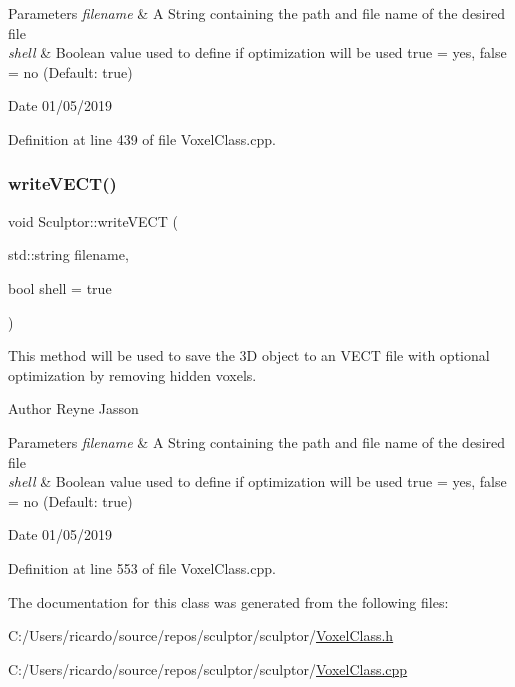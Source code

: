 \begin{DoxyParams}{Parameters}
{\em filename} & A String containing the path and file name of the desired file \\
\hline
{\em shell} & Boolean value used to define if optimization will be used true = yes, false = no (Default\+: true)\\
\hline
\end{DoxyParams}
\begin{DoxyDate}{Date}
01/05/2019 
\end{DoxyDate}


Definition at line 439 of file Voxel\+Class.\+cpp.

\mbox{\label{class_sculptor_a5a83472a0430fa9492e7a9ff5926dedb}} 
\subsubsection{\texorpdfstring{writeVECT()}{writeVECT()}}
{\footnotesize\ttfamily void Sculptor\+::write\+V\+E\+CT (\begin{DoxyParamCaption}\item[{std\+::string}]{filename,  }\item[{bool}]{shell = {\ttfamily true} }\end{DoxyParamCaption})}

This method will be used to save the 3D object to an V\+E\+CT file with optional optimization by removing hidden voxels.

\begin{DoxyAuthor}{Author}
Reyne Jasson
\end{DoxyAuthor}

\begin{DoxyParams}{Parameters}
{\em filename} & A String containing the path and file name of the desired file \\
\hline
{\em shell} & Boolean value used to define if optimization will be used true = yes, false = no (Default\+: true)\\
\hline
\end{DoxyParams}
\begin{DoxyDate}{Date}
01/05/2019 
\end{DoxyDate}


Definition at line 553 of file Voxel\+Class.\+cpp.



The documentation for this class was generated from the following files\+:\begin{DoxyCompactItemize}
\item 
C\+:/\+Users/ricardo/source/repos/sculptor/sculptor/\mbox{\hyperlink{_voxel_class_8h}{Voxel\+Class.\+h}}\item 
C\+:/\+Users/ricardo/source/repos/sculptor/sculptor/\mbox{\hyperlink{_voxel_class_8cpp}{Voxel\+Class.\+cpp}}\end{DoxyCompactItemize}
